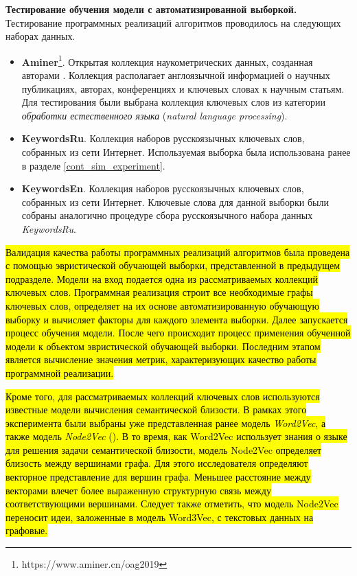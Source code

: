 \textbf{Тестирование обучения модели с автоматизированной выборкой.}
Тестирование программных реализаций алгоритмов проводилось на следующих наборах данных.
\begin{itemize}
    \item \textbf{Aminer}\footnote{https://www.aminer.cn/oag2019}. Открытая коллекция наукометрических данных, созданная авторами \cite{aminer}. Коллекция располагает англоязычной информацией о научных публикациях, авторах, конференциях и ключевых словах к научным статьям. Для тестирования были выбрана коллекция ключевых слов из категории \emph{обработки естественного языка} (\emph{natural language processing}).
    \item \textbf{KeywordsRu}. Коллекция наборов русскоязычных ключевых слов, собранных из сети Интернет. Используемая выборка была использована ранее в разделе \ref{cont_sim_experiment}.
    \item \textbf{KeywordsEn}. Коллекция наборов русскоязычных ключевых слов, собранных из сети Интернет. Ключевые слова для данной выборки были собраны аналогично процедуре сбора русскоязычного набора данных \emph{KeywordsRu}.
\end{itemize}

\hl{Валидация качества работы программных реализаций алгоритмов была проведена с помощью эвристической обучающей выборки, представленной в предыдущем подразделе. Модели на вход подается одна из рассматриваемых коллекций ключевых слов. Программная реализация строит все необходимые графы ключевых слов, определяет на их основе автоматизированную обучающую выборку и вычисляет факторы для каждого элемента выборки. Далее запускается процесс обучения модели. После чего происходит процесс применения обученной модели к объектом эвристической обучающей выборки. Последним этапом является вычисление значения метрик, характеризующих качество работы программной реализации.} 

\hl{Кроме того, для рассматриваемых коллекций ключевых слов используются известные модели вычисления семантической близости. В рамках этого эксперимента были выбраны уже представленная ранее модель \emph{Word2Vec}, а также модель \emph{Node2Vec} (\cite{node2vec}). В то время, как Word2Vec использует знания о языке для решения задачи семантической близости, модель Node2Vec определяет близость между вершинами графа. Для этого исследователя определяют векторное представление для вершин графа. Меньшее расстояние между векторами влечет более выраженную структурную связь между соответствующими вершинами. Следует также отметить, что модель Node2Vec переносит идеи, заложенные в модель Word3Vec, с текстовых данных на графовые.}

